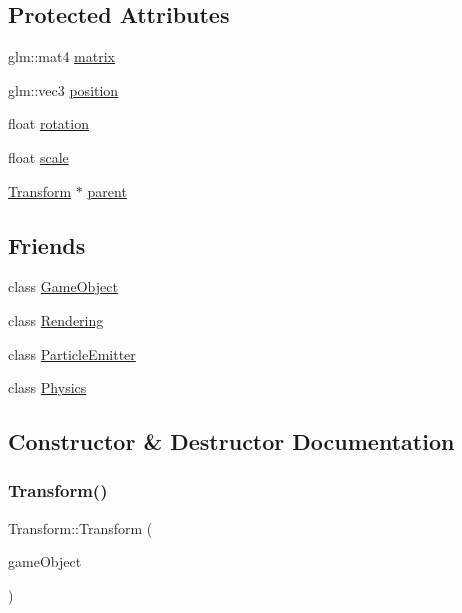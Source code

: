 \subsection*{Protected Attributes}
\begin{DoxyCompactItemize}
\item 
glm\+::mat4 \hyperlink{class_mason_1_1_transform_aeb64a62787375e23645da6f490763c25}{matrix}
\item 
glm\+::vec3 \hyperlink{class_mason_1_1_transform_ac9e11b4ec4433a38ac1100f12c955dcb}{position}
\item 
float \hyperlink{class_mason_1_1_transform_a1ff204c28b286c45743fbbd03d8193a6}{rotation}
\item 
float \hyperlink{class_mason_1_1_transform_a0a12711710700aca2523630c1014dc17}{scale}
\item 
\hyperlink{class_mason_1_1_transform}{Transform} $\ast$ \hyperlink{class_mason_1_1_transform_a1e2c91adcef43bcc170803656260f9db}{parent}
\end{DoxyCompactItemize}
\subsection*{Friends}
\begin{DoxyCompactItemize}
\item 
class \hyperlink{class_mason_1_1_transform_a00df87c957d8f7ee0fc51f07a0542f4a}{Game\+Object}
\item 
class \hyperlink{class_mason_1_1_transform_a33061a25b8332281d02c83e2bf1d4959}{Rendering}
\item 
class \hyperlink{class_mason_1_1_transform_a82b374d797a09668286ac5cf26f539f3}{Particle\+Emitter}
\item 
class \hyperlink{class_mason_1_1_transform_a2bfcbae6c8e1d7af93c5ac1200b1535c}{Physics}
\end{DoxyCompactItemize}


\subsection{Constructor \& Destructor Documentation}
\hypertarget{class_mason_1_1_transform_a61406a0dbfdd518be1d038fc8ed18a7a}{}\label{class_mason_1_1_transform_a61406a0dbfdd518be1d038fc8ed18a7a} 
\subsubsection{\texorpdfstring{Transform()}{Transform()}}
{\footnotesize\ttfamily Transform\+::\+Transform (\begin{DoxyParamCaption}\item[{std\+::shared\+\_\+ptr$<$ \hyperlink{class_mason_1_1_game_object}{Game\+Object} $>$}]{game\+Object }\end{DoxyParamCaption})\hspace{0.3cm}{\ttfamily [protected]}}



